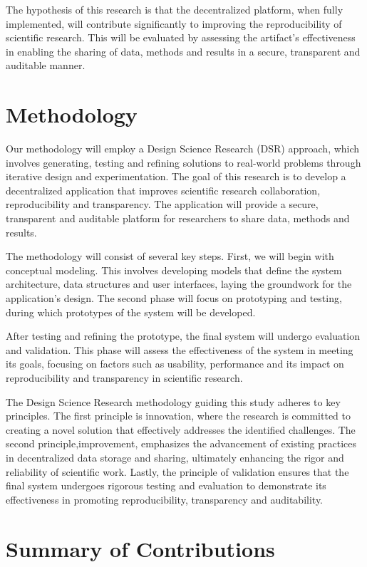 \documentclass{article}
\begin{document}
The hypothesis of this research is that the decentralized platform, when fully implemented, will contribute significantly to improving the reproducibility of scientific research. This will be evaluated by assessing the artifact’s effectiveness in enabling the sharing of data, methods and results in a secure, transparent and auditable manner.

\section{Methodology}

Our methodology will employ a Design Science Research (DSR) approach, which involves generating, testing and refining solutions to real-world problems through iterative design and experimentation. The goal of this research is to develop a decentralized application that improves scientific research collaboration, reproducibility and transparency. The application will provide a secure, transparent and auditable platform for researchers to share data, methods and results.

The methodology will consist of several key steps. First, we will begin with conceptual modeling. This involves developing models that define the system architecture, data structures and user interfaces, laying the groundwork for the application’s design. The second phase will focus on prototyping and testing, during which prototypes of the system will be developed.

After testing and refining the prototype, the final system will undergo evaluation and validation. This phase will assess the effectiveness of the system in meeting its goals, focusing on factors such as usability, performance and its impact on reproducibility and transparency in scientific research.

The Design Science Research methodology guiding this study adheres to key principles. The first principle is innovation, where the research is committed to creating a novel solution that effectively addresses the identified challenges. The second principle,improvement, emphasizes the advancement of existing practices in decentralized data storage and sharing, ultimately enhancing the rigor and reliability of scientific work. Lastly, the principle of validation ensures that the final system undergoes rigorous testing and evaluation to demonstrate its effectiveness in promoting reproducibility, transparency and auditability.

\section{Summary of Contributions}
\end{document}
